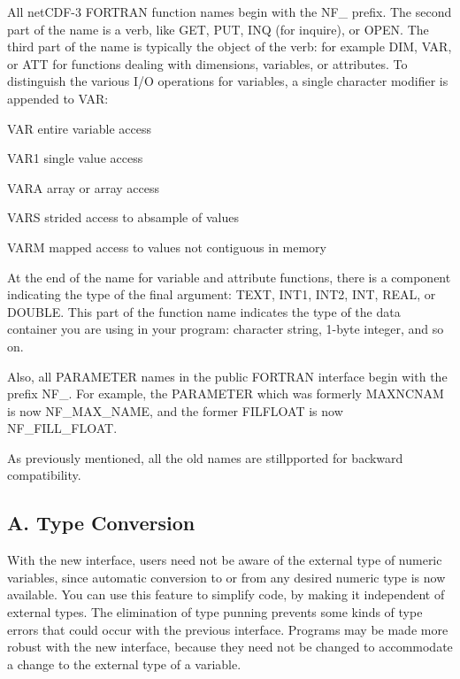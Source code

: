 All net\+C\+D\+F-\/3 F\+O\+R\+T\+R\+AN function names begin with the N\+F\+\_\+ prefix. The second part of the name is a verb, like G\+ET, P\+UT, I\+NQ (for inquire), or O\+P\+EN. The third part of the name is typically the object of the verb\+: for example D\+IM, V\+AR, or A\+TT for functions dealing with dimensions, variables, or attributes. To distinguish the various I/O operations for variables, a single character modifier is appended to V\+AR\+:


\begin{DoxyItemize}
\item V\+AR entire variable access
\item V\+A\+R1 single value access
\item V\+A\+RA array or array access
\item V\+A\+RS strided access to absample of values
\item V\+A\+RM mapped access to values not contiguous in memory
\end{DoxyItemize}

At the end of the name for variable and attribute functions, there is a component indicating the type of the final argument\+: T\+E\+XT, I\+N\+T1, I\+N\+T2, I\+NT, R\+E\+AL, or D\+O\+U\+B\+LE. This part of the function name indicates the type of the data container you are using in your program\+: character string, 1-\/byte integer, and so on.

Also, all P\+A\+R\+A\+M\+E\+T\+ER names in the public F\+O\+R\+T\+R\+AN interface begin with the prefix N\+F\+\_\+. For example, the P\+A\+R\+A\+M\+E\+T\+ER which was formerly M\+A\+X\+N\+C\+N\+AM is now N\+F\+\_\+\+M\+A\+X\+\_\+\+N\+A\+ME, and the former F\+I\+L\+F\+L\+O\+AT is now N\+F\+\_\+\+F\+I\+L\+L\+\_\+\+F\+L\+O\+AT.

As previously mentioned, all the old names are stillpported for backward compatibility.\hypertarget{nc_f77_interface_guide_f77_type_conversion}{}\subsection{A. Type Conversion }\label{nc_f77_interface_guide_f77_type_conversion}
With the new interface, users need not be aware of the external type of numeric variables, since automatic conversion to or from any desired numeric type is now available. You can use this feature to simplify code, by making it independent of external types. The elimination of type punning prevents some kinds of type errors that could occur with the previous interface. Programs may be made more robust with the new interface, because they need not be changed to accommodate a change to the external type of a variable.

